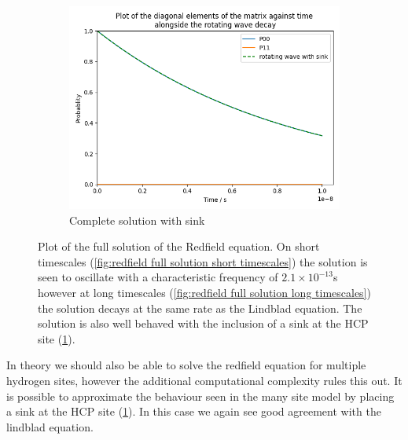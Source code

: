 \begin{figure}[htbp]
\begin{subfigure}{0.45\linewidth}
        \centering
        \includegraphics[width = 0.9\linewidth]{Figures/Redfield/Plot of redfield solution long time sink.png}
        \caption{Complete solution with sink
        }\label{fig:redfield full solution with sink}
    \end{subfigure}
    \caption{Plot of the full solution of the Redfield
    equation. On short timescales
    (\cref{fig:redfield full solution short timescales})
    the solution is seen to
    oscillate with a characteristic
    frequency of \(2.1\times{}10^{-13}\)s however
    at long timescales
    (\cref{fig:redfield full solution long timescales})
    the solution decays at the same rate as the
    Lindblad equation. The solution is
    also well behaved with the inclusion of
    a sink at the HCP site
    (\cref{fig:redfield full solution with sink}).
    }\label{fig:redfield full solution}
\end{figure}
In theory we should also be able
to solve the redfield equation
for multiple hydrogen sites, however
the additional computational complexity
rules this out. It is possible to
approximate the behaviour
seen in the many site model
by placing a sink at
the HCP site
(\cref{fig:redfield full solution with sink}).
In this case
we again see good
agreement with the
lindblad equation.


